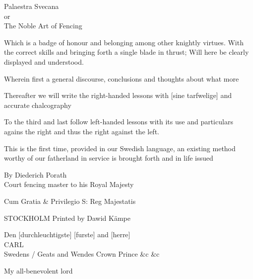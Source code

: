 \cleartoleftpage


\newpage

Palaestra Svecana \\
or \\
The Noble Art of Fencing

Which is a badge of honour and belonging among other knightly
virtues. With the correct skills and bringing forth a single blade in
thrust; Will here be clearly displayed and understood.

Wherein first a general discourse, conclusions and thoughts about what
more 

Thereafter we will write the right-handed lessons with [sine
tarfwelige] and accurate chalcography

To the third and last follow left-handed lessons with its use and
particulars agains the right and thus the right against the left.


This is the first time, provided in our Swedish language, an existing
method worthy of our fatherland in service is brought forth and in
life issued

By Diederich Porath \\
Court fencing master to his Royal Majesty

Cum Gratia \& Privilegio S: Reg Majestatis

STOCKHOLM Printed by Dawid Kämpe

\newpage 


\newpage

Den [durchleuchtigste] [furste] and [herre] \\
CARL \\
Swedens / Geats and Wendes Crown Prince \&c \&c

My all-benevolent lord
